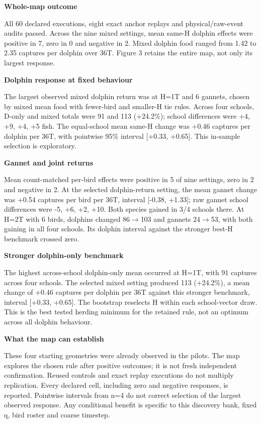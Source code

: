 \documentclass[10pt,a4paper]{article}
\begin{document}
\begin{minipage}[t]{238.10999999999999pt}\vspace{0pt}
\textbf{Whole-map outcome}\par All 60 declared executions, eight exact anchor replays and physical/raw-event audits passed. Across the nine mixed settings, mean same-H dolphin effects were positive in 7, zero in 0 and negative in 2. Mixed dolphin food ranged from 1.42 to 2.35 captures per dolphin over 36T. Figure 3 retains the entire map, not only its largest response.\par\smallskip
\textbf{Dolphin response at fixed behaviour}\par The largest observed mixed dolphin return was at H=1T and 6 gannets, chosen by mixed mean food with fewer-bird and smaller-H tie rules. Across four schools, D-only and mixed totals were 91 and 113 (+24.2\%); school differences were +4, +9, +4, +5 fish. The equal-school mean same-H change was +0.46 captures per dolphin per 36T, with pointwise 95\% interval [+0.33, +0.65]. This in-sample selection is exploratory.\par\smallskip
\textbf{Gannet and joint returns}\par Mean count-matched per-bird effects were positive in 5 of nine settings, zero in 2 and negative in 2. At the selected dolphin-return setting, the mean gannet change was +0.54 captures per bird per 36T, interval [-0.38, +1.33]; raw gannet school differences were -5, +6, +2, +10. Both species gained in 3/4 schools there. At H=2T with 6 birds, dolphins changed 86\ensuremath{\rightarrow}103 and gannets 24\ensuremath{\rightarrow}53, with both gaining in all four schools. Its dolphin interval against the stronger best-H benchmark crossed zero.\par\smallskip
\end{minipage}
\hfill
\begin{minipage}[t]{238.10999999999999pt}\vspace{0pt}
\textbf{Stronger dolphin-only benchmark}\par The highest across-school dolphin-only mean occurred at H=1T, with 91 captures across four schools. The selected mixed setting produced 113 (+24.2\%), a mean change of +0.46 captures per dolphin per 36T against this stronger benchmark, interval [+0.33, +0.65]. The bootstrap reselects H within each school-vector draw. This is the best tested herding minimum for the retained rule, not an optimum across all dolphin behaviour.\par\smallskip
\textbf{What the map can establish}\par These four starting geometries were already observed in the pilots. The map explores the chosen rule after positive outcomes; it is not fresh independent confirmation. Reused controls and exact replay executions do not multiply replication. Every declared cell, including zero and negative responses, is reported. Pointwise intervals from n=4 do not correct selection of the largest observed response. Any conditional benefit is specific to this discovery bank, fixed q, bird roster and coarse timestep.\par\smallskip
\end{minipage}
\end{document}
